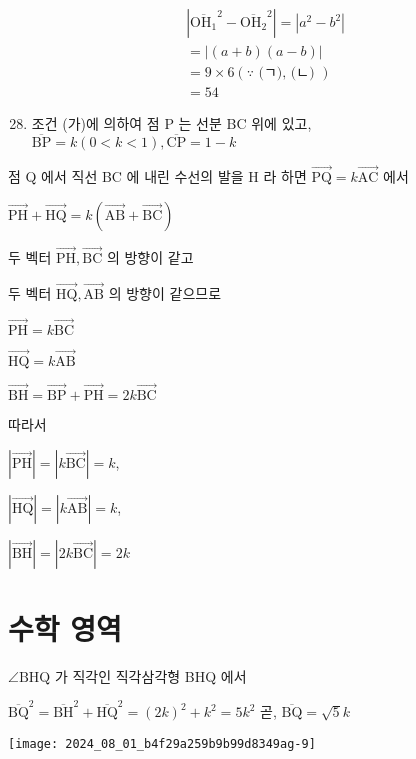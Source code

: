 \documentclass[10pt]{article}
\begin{document}
\begin{align*}
& \left|{\overline{\mathrm{OH}_{1}}}^{2}-{\overline{\mathrm{OH}_{2}}}^{2}\right|=\left|a^{2}-b^{2}\right|  \tag{ㄴ}\\
& =|(a+b)(a-b)| \\
& =9 \times 6(\because \text { (ㄱ), (ㄴ) }) \\
& =54
\end{align*}


\begin{enumerate}
  \setcounter{enumi}{27}
  \item 조건 (가)에 의하여 점 P 는 선분 BC 위에 있고, $\overline{\mathrm{BP}}=k(0<k<1), \overline{\mathrm{CP}}=1-k$
\end{enumerate}

점 Q 에서 직선 BC 에 내린 수선의 발을 H 라 하면 $\overrightarrow{\mathrm{PQ}}=k \overrightarrow{\mathrm{AC}}$ 에서

$\overrightarrow{\mathrm{PH}}+\overrightarrow{\mathrm{HQ}}=k(\overrightarrow{\mathrm{AB}}+\overrightarrow{\mathrm{BC}})$

두 벡터 $\overrightarrow{\mathrm{PH}}, \overrightarrow{\mathrm{BC}}$ 의 방향이 같고

두 벡터 $\overrightarrow{\mathrm{HQ}}, \overrightarrow{\mathrm{AB}}$ 의 방향이 같으므로

$\overrightarrow{\mathrm{PH}}=k \overrightarrow{\mathrm{BC}}$

$\overrightarrow{\mathrm{HQ}}=k \overrightarrow{\mathrm{AB}}$

$\overrightarrow{\mathrm{BH}}=\overrightarrow{\mathrm{BP}}+\overrightarrow{\mathrm{PH}}=2 k \overrightarrow{\mathrm{BC}}$

따라서

$|\overrightarrow{\mathrm{PH}}|=|k \overrightarrow{\mathrm{BC}}|=k$,

$|\overrightarrow{\mathrm{HQ}}|=|k \overrightarrow{\mathrm{AB}}|=k$,

$|\overrightarrow{\mathrm{BH}}|=|2 k \overrightarrow{\mathrm{BC}}|=2 k$

\section*{수학 영역}
$\angle \mathrm{BHQ}$ 가 직각인 직각삼각형 BHQ 에서

$\overline{\mathrm{BQ}}^{2}=\overline{\mathrm{BH}}^{2}+\overline{\mathrm{HQ}}^{2}=(2 k)^{2}+k^{2}=5 k^{2}$ 곧, $\overline{\mathrm{BQ}}=\sqrt{5} k$

\begin{center}
\texttt{[image: 2024\_08\_01\_b4f29a259b9b99d8349ag-9]}
\end{center}
\end{document}
